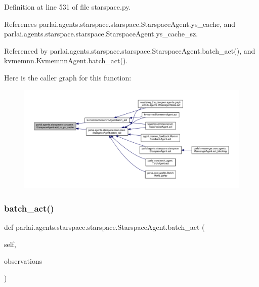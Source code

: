 Definition at line 531 of file starspace.\+py.



References parlai.\+agents.\+starspace.\+starspace.\+Starspace\+Agent.\+ys\+\_\+cache, and parlai.\+agents.\+starspace.\+starspace.\+Starspace\+Agent.\+ys\+\_\+cache\+\_\+sz.



Referenced by parlai.\+agents.\+starspace.\+starspace.\+Starspace\+Agent.\+batch\+\_\+act(), and kvmemnn.\+Kvmemnn\+Agent.\+batch\+\_\+act().

Here is the caller graph for this function\+:
\nopagebreak
\begin{figure}[H]
\begin{center}
\leavevmode
\includegraphics[width=350pt]{classparlai_1_1agents_1_1starspace_1_1starspace_1_1StarspaceAgent_ace15d00770ddf83193ddee499c7c87a1_icgraph}
\end{center}
\end{figure}
\mbox{\label{classparlai_1_1agents_1_1starspace_1_1starspace_1_1StarspaceAgent_a426f2fb245c6a0a409365c4662aec2d2}} 
\subsubsection{\texorpdfstring{batch\+\_\+act()}{batch\_act()}}
{\footnotesize\ttfamily def parlai.\+agents.\+starspace.\+starspace.\+Starspace\+Agent.\+batch\+\_\+act (\begin{DoxyParamCaption}\item[{}]{self,  }\item[{}]{observations }\end{DoxyParamCaption})}



